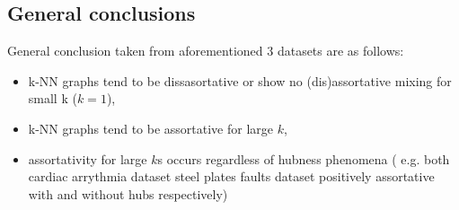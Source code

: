 \subsection{General conclusions}
General conclusion taken from aforementioned 3 datasets are as follows:
\begin{itemize}
\item k-NN graphs tend to be dissasortative or show no (dis)assortative mixing for small k ($k = 1$),
\item k-NN graphs tend to be assortative for large $k$,
\item assortativity for large $k$s occurs regardless of hubness phenomena ( e.g. both cardiac arrythmia dataset steel plates faults dataset positively assortative with and without hubs respectively) 
\end{itemize}

